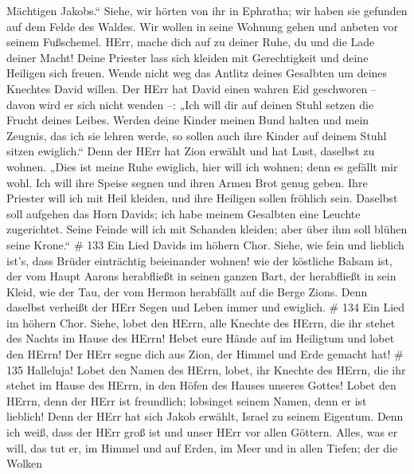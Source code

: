 Mächtigen Jakobs.``  Siehe, wir hörten von ihr in Ephratha;
wir haben sie gefunden auf dem Felde des Waldes.  Wir wollen
in seine Wohnung gehen und anbeten vor seinem Fußschemel. 
HErr, mache dich auf zu deiner Ruhe, du und die Lade deiner Macht!
 Deine Priester lass sich kleiden mit Gerechtigkeit und
deine Heiligen sich freuen.  Wende nicht weg das Antlitz
deines Gesalbten um deines Knechtes David willen.  Der HErr
hat David einen wahren Eid geschworen -- davon wird er sich nicht wenden
--: „Ich will dir auf deinen Stuhl setzen die Frucht deines Leibes.
 Werden deine Kinder meinen Bund halten und mein Zeugnis,
das ich sie lehren werde, so sollen auch ihre Kinder auf deinem Stuhl
sitzen ewiglich.``  Denn der HErr hat Zion erwählt und hat
Lust, daselbst zu wohnen.  „Dies ist meine Ruhe ewiglich,
hier will ich wohnen; denn es gefällt mir wohl.  Ich will
ihre Speise segnen und ihren Armen Brot genug geben.  Ihre
Priester will ich mit Heil kleiden, und ihre Heiligen sollen fröhlich
sein.  Daselbst soll aufgehen das Horn Davids; ich habe
meinem Gesalbten eine Leuchte zugerichtet.  Seine Feinde
will ich mit Schanden kleiden; aber über ihm soll blühen seine Krone.``
\# 133  Ein Lied Davids im höhern Chor. Siehe, wie fein und
lieblich ist's, dass Brüder einträchtig beieinander wohnen! 
wie der köstliche Balsam ist, der vom Haupt Aarons herabfließt in seinen
ganzen Bart, der herabfließt in sein Kleid,  wie der Tau,
der vom Hermon herabfällt auf die Berge Zions. Denn daselbst verheißt
der HErr Segen und Leben immer und ewiglich. \# 134  Ein
Lied im höhern Chor. Siehe, lobet den HErrn, alle Knechte des HErrn, die
ihr stehet des Nachts im Hause des HErrn!  Hebet eure Hände
auf im Heiligtum und lobet den HErrn!  Der HErr segne dich
aus Zion, der Himmel und Erde gemacht hat! \# 135 
Halleluja! Lobet den Namen des HErrn, lobet, ihr Knechte des HErrn,
 die ihr stehet im Hause des HErrn, in den Höfen des Hauses
unseres Gottes!  Lobet den HErrn, denn der HErr ist
freundlich; lobsinget seinem Namen, denn er ist lieblich! 
Denn der HErr hat sich Jakob erwählt, Israel zu seinem Eigentum.
 Denn ich weiß, dass der HErr groß ist und unser HErr vor
allen Göttern.  Alles, was er will, das tut er, im Himmel
und auf Erden, im Meer und in allen Tiefen;  der die Wolken
